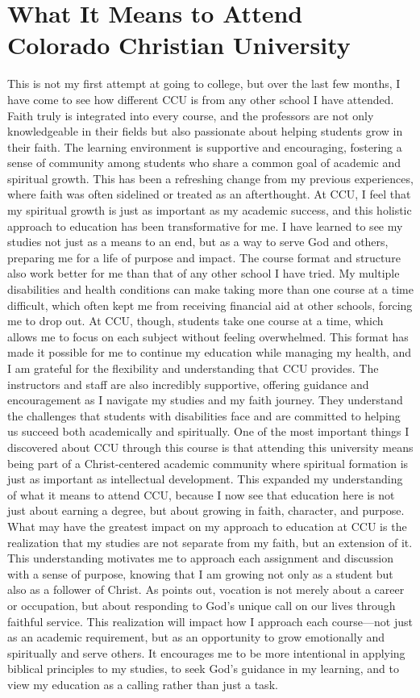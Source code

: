 \documentclass[stu,12pt,floatsintext]{apa7}
\begin{document}
\section{What It Means to Attend Colorado Christian University}
This is not my first attempt at going to college, but over the last few months, I have come to see how different CCU is from any other school I have attended. Faith truly is integrated into every course, and the professors are not only knowledgeable in their fields but also passionate about helping students grow in their faith. The learning environment is supportive and encouraging, fostering a sense of community among students who share a common goal of academic and spiritual growth. This has been a refreshing change from my previous experiences, where faith was often sidelined or treated as an afterthought. At CCU, I feel that my spiritual growth is just as important as my academic success, and this holistic approach to education has been transformative for me. I have learned to see my studies not just as a means to an end, but as a way to serve God and others, preparing me for a life of purpose and impact.
The course format and structure also work better for me than that of any other school I have tried. My multiple disabilities and health conditions can make taking more than one course at a time difficult, which often kept me from receiving financial aid at other schools, forcing me to drop out. At CCU, though, students take one course at a time, which allows me to focus on each subject without feeling overwhelmed. This format has made it possible for me to continue my education while managing my health, and I am grateful for the flexibility and understanding that CCU provides. The instructors and staff are also incredibly supportive, offering guidance and encouragement as I navigate my studies and my faith journey. They understand the challenges that students with disabilities face and are committed to helping us succeed both academically and spiritually.  
One of the most important things I discovered about CCU through this course is that attending this university means being part of a Christ-centered academic community where spiritual formation is just as important as intellectual development. This expanded my understanding of what it means to attend CCU, because I now see that education here is not just about earning a degree, but about growing in faith, character, and purpose. What may have the greatest impact on my approach to education at CCU is the realization that my studies are not separate from my faith, but an extension of it. This understanding motivates me to approach each assignment and discussion with a sense of purpose, knowing that I am growing not only as a student but also as a follower of Christ. As \textcite{Smith2024} points out, vocation is not merely about a career or occupation, but about responding to God’s unique call on our lives through faithful service. This realization will impact how I approach each course—not just as an academic requirement, but as an opportunity to grow emotionally and spiritually and serve others. It encourages me to be more intentional in applying biblical principles to my studies, to seek God’s guidance in my learning, and to view my education as a calling rather than just a task.
\end{document}
